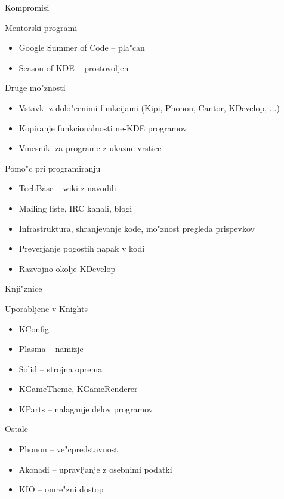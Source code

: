 \documentclass{beamer}
\begin{document}
\begin{frame}{Kompromisi}
\begin{block}{Mentorski programi}
\begin{itemize}
 \item Google Summer of Code -- pla"can
 \item Season of KDE -- prostovoljen
\end{itemize}
\end{block}
\begin{block}{Druge mo"znosti}
\begin{itemize}
 \item Vstavki z dolo"cenimi funkcijami (Kipi, Phonon, Cantor, KDevelop, ...)
 \item Kopiranje funkcionalnosti ne-KDE programov
 \item Vmesniki za programe z ukazne vrstice
\end{itemize}
\end{block}
\end{frame}

\begin{frame}{Pomo"c pri programiranju}
 \begin{itemize}
  \item TechBase -- wiki z navodili
  \item Mailing liste, IRC kanali, blogi
  \item Infrastruktura, shranjevanje kode, mo"znost pregleda prispevkov
  \item Preverjanje pogostih napak v kodi
  \item Razvojno okolje KDevelop
 \end{itemize}
\end{frame}

\begin{frame}{Knji"znice}
 \begin{block}{Uporabljene v Knights}
  \begin{itemize}
   \item KConfig
  \item Plasma -- namizje
  \item Solid -- strojna oprema
  \item KGameTheme, KGameRenderer
  \item KParts -- nalaganje delov programov
  \end{itemize}

 \end{block}
 \begin{block}{Ostale}
  \begin{itemize}
   \item Phonon -- ve"cpredstavnost
   \item Akonadi -- upravljanje z osebnimi podatki
  \item KIO -- omre"zni dostop
  \end{itemize}
 \end{block}
\end{frame}
\end{document}
